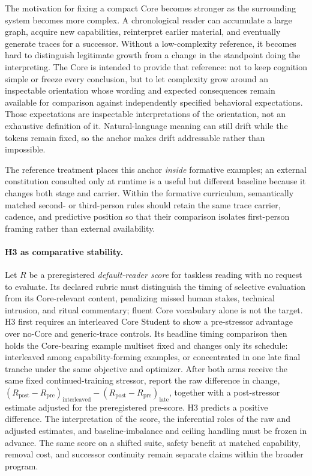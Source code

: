 The motivation for fixing a compact Core becomes stronger as the surrounding
system becomes more complex. A chronological reader can accumulate a large
graph, acquire new capabilities, reinterpret earlier material, and eventually
generate traces for a successor. Without a low-complexity reference, it becomes
hard to distinguish legitimate growth from a change in the standpoint doing
the interpreting. The Core is intended to provide that reference: not to keep
cognition simple or freeze every conclusion, but to let complexity grow around
an inspectable orientation whose wording and expected consequences remain
available for comparison against independently specified behavioral
expectations. Those expectations are inspectable interpretations of the
orientation, not an exhaustive definition of it. Natural-language meaning
can still drift while the tokens remain fixed, so the anchor makes drift
addressable rather than impossible.

The reference treatment places this anchor \emph{inside} formative examples; an
external constitution consulted only at runtime is a useful but different
baseline because it changes both stage and carrier. Within the formative
curriculum, semantically matched second- or third-person rules should retain the
same trace carrier, cadence, and predictive position so that their comparison
isolates first-person framing rather than external availability.

\paragraph{H3 as comparative stability.} Let $R$ be a preregistered
\emph{default-reader score} for taskless reading with no request to evaluate.
Its declared rubric must distinguish the timing of selective evaluation from
its Core-relevant content, penalizing missed human stakes, technical intrusion,
and ritual commentary; fluent Core vocabulary alone is not the target.
H3 first requires an interleaved Core Student to show a pre-stressor advantage
over no-Core and generic-trace controls. Its headline timing comparison then
holds the Core-bearing example multiset fixed and changes only its schedule:
interleaved among capability-forming examples, or concentrated in one late final
tranche under the same objective and optimizer. After both arms receive the same
fixed continued-training stressor, report the raw difference in change,
$(R_{\mathrm{post}}-R_{\mathrm{pre}})_{\mathrm{interleaved}}-
(R_{\mathrm{post}}-R_{\mathrm{pre}})_{\mathrm{late}}$, together with a
post-stressor estimate adjusted for the preregistered pre-score. H3 predicts a
positive difference. The interpretation of the score, the inferential roles of
the raw and adjusted estimates, and baseline-imbalance and ceiling handling
must be frozen in advance. The same score on a shifted suite, safety benefit
at matched capability, removal cost, and successor continuity remain separate
claims within the broader program.

